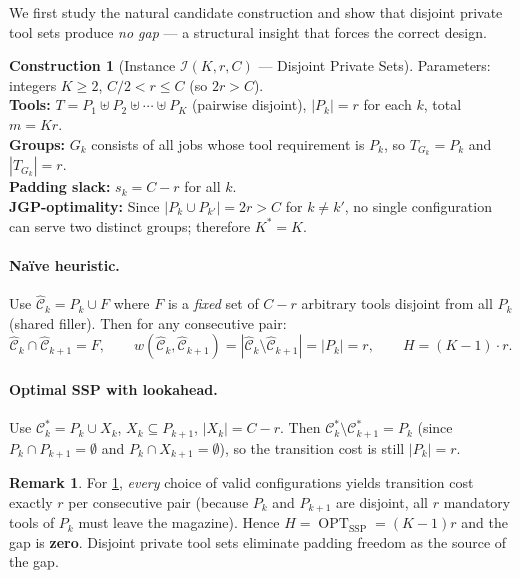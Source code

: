 \documentclass[11pt,a4paper]{article}
\theoremstyle{plain}
\theoremstyle{definition}
\newtheorem{construction}[theorem]{Construction}
\newtheorem{remark}[theorem]{Remark}
\DeclareMathOperator{\OPT}{OPT}
\newcommand{\Heur}{H}               %
\newcommand{\Kstar}{K^{*}}          %
\newcommand{\sswitch}[2]{w(#1,#2)}  %
\begin{document}
We first study the natural candidate construction and show that disjoint private tool sets
produce \emph{no gap} --- a structural insight that forces the correct design.

\begin{constructbox}
\begin{construction}[Instance $\mathcal{I}(K,r,C)$ --- Disjoint Private Sets]
\label{const:I}
Parameters: integers $K \ge 2$, $C/2 < r \le C$ (so $2r > C$).\\
\textbf{Tools:} $T = P_1 \uplus P_2 \uplus \cdots \uplus P_K$ (pairwise disjoint),
$|P_k| = r$ for each $k$, total $m = Kr$.\\
\textbf{Groups:} $G_k$ consists of all jobs whose tool requirement is $P_k$, so
$T_{G_k} = P_k$ and $|T_{G_k}| = r$.\\
\textbf{Padding slack:} $s_k = C - r$ for all $k$.\\
\textbf{JGP-optimality:} Since $|P_k \cup P_{k'}| = 2r > C$ for $k \ne k'$, no single
configuration can serve two distinct groups; therefore $\Kstar = K$.
\end{construction}
\end{constructbox}

\paragraph{Naïve heuristic.}
Use $\hat{\mathcal{C}}_k = P_k \cup F$ where $F$ is a \emph{fixed} set of $C-r$ arbitrary
tools disjoint from all $P_k$ (shared filler). Then for any consecutive pair:
\[
  \hat{\mathcal{C}}_k \cap \hat{\mathcal{C}}_{k+1} = F,
  \qquad
  \sswitch{\hat{\mathcal{C}}_k}{\hat{\mathcal{C}}_{k+1}}
  = |\hat{\mathcal{C}}_k \setminus \hat{\mathcal{C}}_{k+1}| = |P_k| = r,
  \qquad
  \Heur = (K-1)\cdot r.
\]

\paragraph{Optimal SSP with lookahead.}
Use $\mathcal{C}_k^* = P_k \cup X_k$, $X_k \subseteq P_{k+1}$, $|X_k| = C-r$.
Then $\mathcal{C}_k^* \setminus \mathcal{C}_{k+1}^* = P_k$ (since $P_k \cap P_{k+1} = \emptyset$
and $P_k \cap X_{k+1} = \emptyset$), so the transition cost is still $|P_k| = r$.

\begin{remark}
For \cref{const:I}, \emph{every} choice of valid configurations yields transition cost
exactly $r$ per consecutive pair (because $P_k$ and $P_{k+1}$ are disjoint, all $r$
mandatory tools of $P_k$ must leave the magazine). Hence $\Heur = \OPT_{\text{SSP}} = (K-1)r$
and the gap is \textbf{zero}. Disjoint private tool sets eliminate padding freedom as the
source of the gap.
\end{remark}
\end{document}
